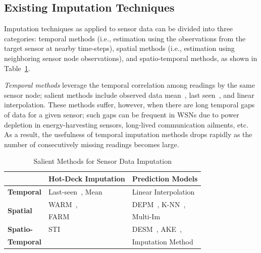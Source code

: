 
\subsection{Existing Imputation Techniques}

Imputation techniques as applied to sensor data can be divided into three categories:
temporal methods (i.e., estimation using the observations from the target sensor at nearby time-steps), 
spatial methods (i.e., estimation using neighboring sensor node observations), 
and spatio-temporal methods, as shown in Table~\ref{tbl:methods}.


{\em Temporal methods} leverage the temporal correlation among
readings by the same sensor node; salient methods include observed
data mean~\cite{madden2005tinydb}, last
seen~\cite{Granger:lastseen}, and linear interpolation.  These methods
suffer, however, when there are long temporal gaps of data for a given
sensor; such gaps can be frequent in WSNs due to power depletion in
energy-harvesting sensors, long-lived communication ailments, etc.  
As a result, the usefulness of temporal imputation
methods drops rapidly as the number of consecutively missing readings
becomes large.


\begin{table}
\caption{Salient Methods for Sensor Data Imputation}
\label{tbl:methods}
\centering
{\small
\begin{tabular}{|l|l|l|} \hline
   &{\bf Hot-Deck Imputation}&{\bf Prediction Models}\\ \hline
{\bf Temporal} & Last-seen~\cite{Granger:lastseen}, Mean& Linear Interpolation\\ \hline
\multirow{2}{*}{\bf Spatial}& WARM~\cite{le2005estimating},& DEPM~\cite{li2008data}, K-NN~\cite{pan2010k},\\ 
&FARM~\cite{Gruenwald:FARM}&Multi-Im~\cite{yuan2000multiple}\\\hline
{\bf Spatio-}&STI~\cite{Jian-Zhong:STI}&DESM~\cite{li2008data}, AKE~\cite{pan2010k},\\
{\bf Temporal}&&Imputation Method~\cite{Lim:robust} \\\hline \end{tabular}
}
\vspace{-0.1in}
\end{table}


